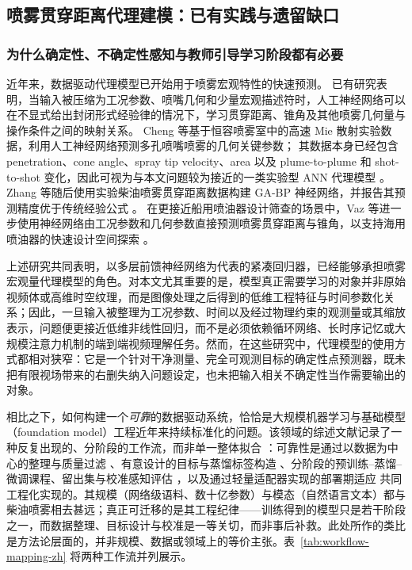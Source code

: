 \subsection{喷雾贯穿距离代理建模：已有实践与遗留缺口}

\subsubsection{为什么确定性、不确定性感知与教师引导学习阶段都有必要}

近年来，数据驱动代理模型已开始用于喷雾宏观特性的快速预测。
已有研究表明，当输入被压缩为工况参数、喷嘴几何和少量宏观描述符时，人工神经网络可以在不显式给出封闭形式经验律的情况下，学习贯穿距离、锥角及其他喷雾几何量与操作条件之间的映射关系。
Cheng 等基于恒容喷雾室中的高速 Mie 散射实验数据，利用人工神经网络预测多孔喷嘴喷雾的几何关键参数；
其数据本身已经包含 penetration、cone angle、spray tip velocity、area 以及 plume-to-plume 和 shot-to-shot 变化，因此可视为与本文问题较为接近的一类实验型 ANN 代理模型 \cite{ChengAhmadGrahn2023}。
Zhang 等随后使用实验柴油喷雾贯穿距离数据构建 GA-BP 神经网络，并报告其预测精度优于传统经验公式 \cite{ZhangWuXu2024}。
在更接近船用喷油器设计筛查的场景中，Vaz 等进一步使用神经网络由工况参数和几何参数直接预测喷雾贯穿距离与锥角，以支持海用喷油器的快速设计空间探索 \cite{VazKarathanasis2026}。

上述研究共同表明，以多层前馈神经网络为代表的紧凑回归器，已经能够承担喷雾宏观量代理模型的角色。对本文尤其重要的是，模型真正需要学习的对象并非原始视频体或高维时空纹理，而是图像处理之后得到的低维工程特征与时间参数化关系；因此，一旦输入被整理为工况参数、时间以及经过物理约束的观测量或其缩放表示，问题便更接近低维非线性回归，而不是必须依赖循环网络、长时序记忆或大规模注意力机制的端到端视频理解任务。然而，在这些研究中，代理模型的使用方式都相对狭窄：它是一个针对干净测量、完全可观测目标的确定性点预测器，既未把有限视场带来的右删失纳入问题设定，也未把输入相关不确定性当作需要输出的对象。

相比之下，如何构建一个\emph{可靠}的数据驱动系统，恰恰是大规模机器学习与基础模型（foundation model）工程近年来持续标准化的问题。该领域的综述文献记录了一种反复出现的、分阶段的工作流，而非单一整体拟合 \cite{Zhao2023LLMSurvey,Bommasani2021FoundationModels}：可靠性是通过以数据为中心的整理与质量过滤 \cite{Albalak2024DataSelection}、有意设计的目标与蒸馏标签构造 \cite{Xu2024LLMDistillation,Liu2024SyntheticData}、分阶段的预训练--蒸馏--微调课程、留出集与校准感知评估 \cite{Chang2024LLMEval}，以及通过轻量适配器实现的部署期适应 \cite{Han2024PEFT} 共同工程化实现的。其规模（网络级语料、数十亿参数）与模态（自然语言文本）都与柴油喷雾相去甚远；真正可迁移的是其工程纪律——训练得到的模型只是若干阶段之一，而数据整理、目标设计与校准是一等关切，而非事后补救。此处所作的类比是方法论层面的，并非规模、数据或领域上的等价主张。表~\ref{tab:workflow-mapping-zh} 将两种工作流并列展示。

